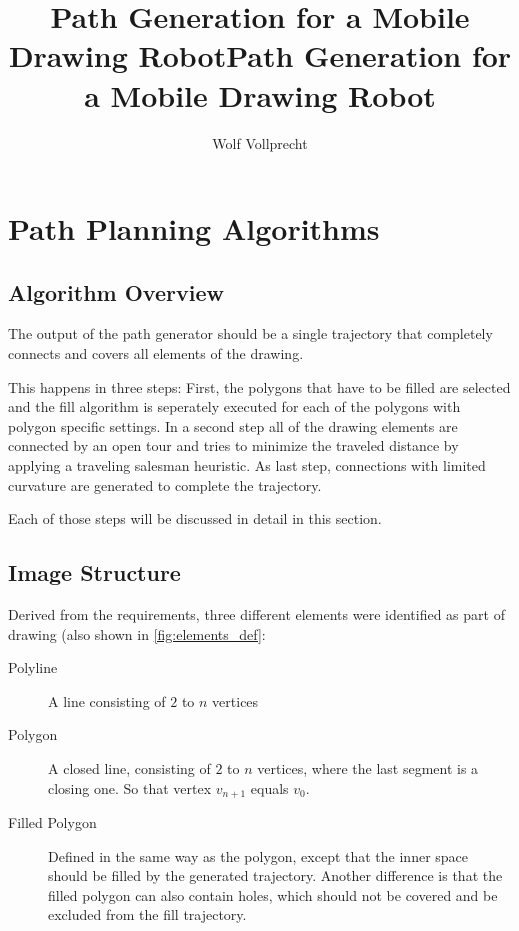 \documentclass[10pt,twoside,a4paper]{report}
\title{Path Generation for a Mobile Drawing Robot}
\begin{document}
\pagestyle{plain}

\author{Wolf Vollprecht}
\title{Path Generation for a Mobile Drawing Robot}

%
%
%


\pagestyle{fancy}






\chapter{Path Planning Algorithms}
\section{Algorithm Overview}

The output of the path generator should be a single trajectory that completely connects and covers all elements of the drawing.

This happens in three steps: First, the polygons that have to be filled are selected and the fill algorithm is seperately executed for each of the polygons with polygon specific settings. In a second step all of the drawing elements are connected by an open tour and tries to minimize the traveled distance by applying a traveling salesman heuristic. As last step, connections with limited curvature are generated to complete the trajectory.

Each of those steps will be discussed in detail in this section.
\section{Image Structure}

Derived from the requirements, three different elements were identified as part of drawing (also shown in \autoref{fig:elements_def}:

\begin{description}
\item[Polyline] A line consisting of $2$ to $n$ vertices
\item[Polygon] A closed line, consisting of $2$ to $n$ vertices, where the last segment is a closing one. So that vertex $v_{n+1}$ equals $v_0$.
\item[Filled Polygon] Defined in the same way as the polygon, except that the inner space should be filled by the generated trajectory. Another difference is that the filled polygon can also contain holes, which should not be covered and be excluded from the fill trajectory.
\end{description}
\end{document}
